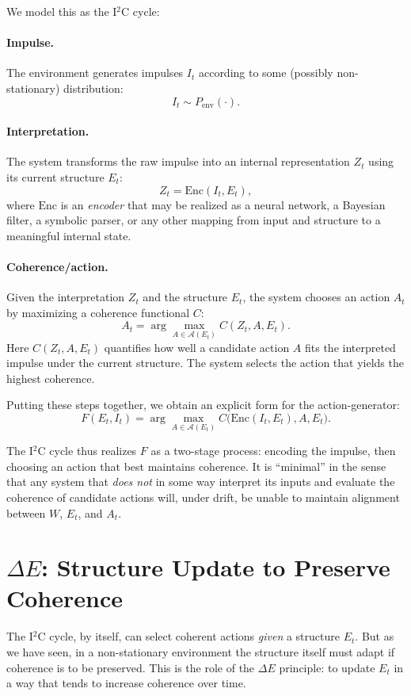 \documentclass[12pt,a4paper]{report}
\newcommand{\Will}{W}
\begin{document}
We model this as the I$^2$C cycle:

\paragraph{Impulse.} The environment generates impulses \(I_t\) according to some (possibly non-stationary) distribution:
\[
    I_t \sim P_{\mathrm{env}}(\cdot).
\]

\paragraph{Interpretation.} The system transforms the raw impulse into an internal representation \(Z_t\) using its current structure \(E_t\):
\[
    Z_t = \mathrm{Enc}(I_t, E_t),
\]
where \(\mathrm{Enc}\) is an \emph{encoder} that may be realized as a neural network, a Bayesian filter, a symbolic parser, or any other mapping from input and structure to a meaningful internal state.

\paragraph{Coherence/action.} Given the interpretation \(Z_t\) and the structure \(E_t\), the system chooses an action \(A_t\) by maximizing a coherence functional \(C\):
\[
    A_t = \arg\max_{A \in \mathcal{A}(E_t)} C(Z_t, A, E_t).
\]
Here \(C(Z_t, A, E_t)\) quantifies how well a candidate action \(A\) fits the interpreted impulse under the current structure. The system selects the action that yields the highest coherence.

Putting these steps together, we obtain an explicit form for the action-generator:
\[
    F(E_t, I_t) = \arg\max_{A \in \mathcal{A}(E_t)} 
        C\bigl(\mathrm{Enc}(I_t, E_t), A, E_t\bigr).
\]

The I$^2$C cycle thus realizes \(F\) as a two-stage process: encoding the impulse, then choosing an action that best maintains coherence. It is ``minimal'' in the sense that any system that \emph{does not} in some way interpret its inputs and evaluate the coherence of candidate actions will, under drift, be unable to maintain alignment between \(\Will\), \(E_t\), and \(A_t\).

\section{\texorpdfstring{$\Delta E$}{ΔE}: Structure Update to Preserve Coherence}

The I$^2$C cycle, by itself, can select coherent actions \emph{given} a structure \(E_t\). But as we have seen, in a non-stationary environment the structure itself must adapt if coherence is to be preserved. This is the role of the \(\Delta E\) principle: to update \(E_t\) in a way that tends to increase coherence over time.
\end{document}
